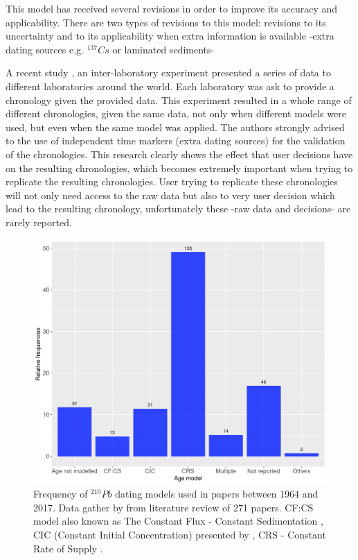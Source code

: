 \documentclass [10pt] {article}
\begin{document}
This model has received several revisions  in order to improve its accuracy and applicability. 
There are two types of revisions to this model: revisions to its uncertainty \citep{Binford1990,Appleby2001,Sanchez-Cabeza2014} and to its applicability when extra information is available -extra dating sources e.g. $^{137}Cs$ or laminated sediments- \citep{Appleby1998,Appleby2001,Appleby2008}

A recent study \citep{Barsanti2020}, an inter-laboratory experiment presented a series of data to different laboratories around the world.
Each laboratory was ask to provide a chronology given the provided data.
This experiment resulted in a whole range of different chronologies, given the same data, not only when different models were used, but even when the same model was applied.
The authors strongly advised to the use of independent time markers (extra dating sources) for the validation of the chronologies.
This research clearly shows the effect that user decisions have on the resulting chronologies, which becomes extremely important when trying to replicate the resulting chronologies.
User trying to replicate these chronologies will not only need access to the raw data but also to very user decision which lead to the resulting chronology, unfortunately these -raw data and decisions- are rarely reported.


\begin{figure}[h!]
	\begin{centering}
		\includegraphics[width=.75\linewidth]{210Pbmodels-bar.pdf}
		\caption{Frequency of $^{210}Pb$ dating models used in papers between 1964 and 2017. Data gather by \citet{Courtney2019} from literature review of 271 papers. CF:CS model also known as The Constant Flux - Constant Sedimentation \citep{Robbins1978}, CIC (Constant Initial Concentration) presented by \citet{Goldberg1963,Crozaz1964,Robbins1978}, CRS - Constant Rate of Supply \citep{Appleby1978,Robbins1978}. }
		\label{fig:210models}
	\end{centering}
\end{figure}
\end{document}
